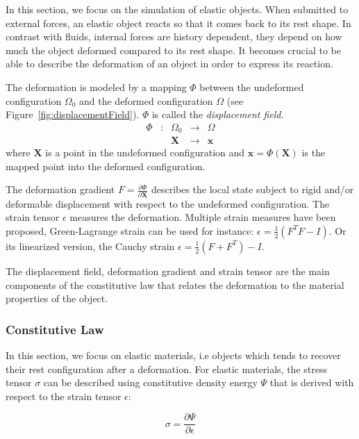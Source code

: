 In this section, we focus on the simulation of elastic objects. When submitted to external forces, an elastic object reacts so that it comes back to its rest shape. In contrast with fluids, internal forces are history dependent, they depend on how much the object deformed compared to its rest shape. It becomes crucial to be able to describe the deformation of an object in order to express its reaction. 

The deformation is modeled by a mapping $\Phi$ between the undeformed configuration $\Omega_{0}$ and the deformed configuration $\Omega$ (see Figure~\ref{fig:displacementField}). $\Phi$ is called the \emph{displacement field}.
\begin{equation}
\begin{array}{lllll}
\Phi & : & \Omega_{0} & \longrightarrow & \Omega \\
	 &  & \mathbf{X} & \longrightarrow & \mathbf{x}
\end{array}
\end{equation}
where $\mathbf{X}$ is a point in the undeformed configuration and $\mathbf{x}=\Phi(\mathbf{X})$ is the mapped point into the deformed configuration.

The deformation gradient $\displaystyle F = \frac{\partial \Phi}{\partial \mathbf{X}}$ describes the local state subject to rigid and/or deformable displacement with respect to the undeformed configuration. 
The strain tensor $\epsilon$ measures the deformation.
Multiple strain measures have been proposed, Green-Lagrange strain can be used for instance: $\displaystyle \epsilon = \frac{1}{2}\left(F^{T}F - I\right)$. 
Or its linearized version, the Cauchy strain $\displaystyle \epsilon = \frac{1}{2}\left( F + F^{T} \right)-I$.

The displacement field, deformation gradient and strain tensor are the main components of the constitutive law that relates the deformation to the material properties of the object.

\subsubsection{Constitutive Law}
In this section, we focus on elastic materials, i.e objects which tends to recover their rest configuration after a deformation.
For elastic materials, the stress tensor $\sigma$ can be described using constitutive density energy $\Psi$ that is derived with respect to the strain tensor $\epsilon$:

\begin{equation}
\label{eq:constitutiveLaw}
\sigma = \frac{\partial \Psi}{\partial \epsilon}
\end{equation}


